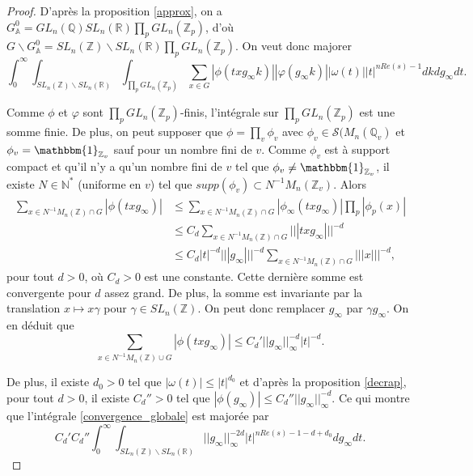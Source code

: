 \begin{proof}
D'après la proposition \ref{approx}, on a $G^0_\mathbb{A} = GL_n(\mathbb{Q})SL_n(\mathbb{R})\prod_p GL_n(\mathbb{Z}_p)$, d'où $G \backslash G^0_\mathbb{A} = SL_n(\mathbb{Z}) \backslash SL_n(\mathbb{R}) \prod_p GL_n(\mathbb{Z}_p)$. On veut donc majorer
\begin{equation}
\label{convergence_globale}
\int_0^\infty \int_{SL_n(\mathbb{Z}) \backslash SL_n(\mathbb{R})} \int_{\prod_p GL_n(\mathbb{Z}_p)} \sum_{x \in G}{|\phi(txg_\infty k)|} |\varphi(g_\infty k)| |\omega(t)| |t|^{nRe(s)-1} dk dg_\infty dt.
\end{equation}

Comme $\phi$ et $\varphi$ sont $\prod_p GL_n(\mathbb{Z}_p)$-finis, l'intégrale sur $\prod_p GL_n(\mathbb{Z}_p)$ est une somme finie. De plus, on peut supposer que $\phi = \prod_v \phi_v$ avec $\phi_v \in \mathcal{S}(M_n(\mathbb{Q}_v)$ et $\phi_v = \mathbbm{1}_{\mathbb{Z}_v}$ sauf pour un nombre fini de $v$. Comme $\phi_v$ est à support compact et qu'il n'y a qu'un nombre fini de $v$ tel que $\phi_v \neq \mathbbm{1}_{\mathbb{Z}_v}$, il existe $N \in \mathbb{N}^*$ (uniforme en $v$) tel que $supp(\phi_v) \subset N^{-1}M_n(\mathbb{Z}_v)$. Alors
\begin{align}
\sum_{x \in N^{-1}M_n(\mathbb{Z}) \cap G} |\phi(txg_\infty)| &\leq \sum_{x \in N^{-1}M_n(\mathbb{Z}) \cap G} |\phi_\infty(txg_\infty)|\prod_p |\phi_p(x)| \\
&\leq C_d \sum_{x \in N^{-1}M_n(\mathbb{Z}) \cap G} |||txg_\infty|||^{-d} \\
&\leq C_d |t|^{-d}|||g_\infty|||^{-d}\sum_{x \in N^{-1}M_n(\mathbb{Z}) \cap G} |||x|||^{-d},
\end{align}
pour tout $d > 0$, où $C_d > 0$ est une constante. Cette dernière somme est convergente pour $d$ assez grand. De plus, la somme est invariante par la translation $x \mapsto x\gamma$ pour $\gamma \in SL_n(\mathbb{Z})$. On peut donc remplacer $g_\infty$ par $\gamma g_\infty$. On en déduit que
\begin{equation}
\sum_{x \in N^{-1}M_n(\mathbb{Z}) \cup G} |\phi(txg_\infty)| \leq C_d' ||g_\infty ||^{-d}_{\infty} |t|^{-d}.
\end{equation}

De plus, il existe $d_0 > 0$ tel que $|\omega(t)| \leq |t|^{d_0}$ et d'après la proposition \ref{decrap}, pour tout $d > 0$, il existe $C_d'' > 0$ tel que $|\phi(g_\infty)| \leq C_d'' ||g_\infty||^{-d}_\infty$. Ce qui montre que l'intégrale \ref{convergence_globale} est majorée par
\begin{equation}
C_d'C_d''\int_0^\infty \int_{SL_n(\mathbb{Z}) \backslash SL_n(\mathbb{R})} ||g_\infty||^{-2d}_\infty|t|^{nRe(s)-1-d+d_0} dg_\infty dt.
\end{equation}


\end{proof}
